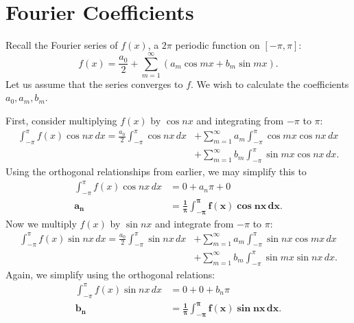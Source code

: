 \documentclass{amsart}
\begin{document}
  \section{Fourier Coefficients}

  Recall the Fourier series of $f(x)$, a $2\pi$ periodic function on $[-\pi, \pi]$:
  \begin{equation}
    f(x) = \frac{a_0}{2} + \sum_{m=1}^{\infty} (a_m \cos mx + b_m \sin mx).
  \end{equation}
  Let us assume that the series converges to $f$. We wish to calculate the coefficients $a_0, a_m, b_m$. 

  First, consider multiplying $f(x)$ by $\cos nx$ and integrating from $-\pi$ to $\pi$:
  \begin{align*}
    \int_{-\pi}^{\pi} f(x) \cos nx \, dx = \frac{a_0}{2} \int_{-\pi}^{\pi} \cos nx \, dx &+ \sum_{m=1}^{\infty} a_m \int_{-\pi}^{\pi}\cos mx \cos nx \, dx \\ &+ \sum_{m=1}^{\infty} b_m \int_{-\pi}^{\pi} \sin mx \cos nx \, dx .
  \end{align*}
  Using the orthogonal relationships from earlier, we may simplify this to 
  \begin{align*}
    \int_{-\pi}^{\pi} f(x) \cos nx \, dx &= 0 + a_n \pi + 0\\
    \bm{a_n} &\bm{= \frac{1}{\pi} \int_{-\pi}^{\pi} f(x) \cos nx \, dx} .
  \end{align*}
  Now we multiply $f(x)$ by $\sin nx$ and integrate from $-\pi$ to $\pi$:
  \begin{align*}
    \int_{-\pi}^{\pi} f(x) \sin nx \, dx = \frac{a_0}{2} \int_{-\pi}^{\pi} \sin nx \, dx &+ \sum_{m=1}^{\infty} a_m \int_{-\pi}^{\pi}\sin nx \cos mx \, dx \\ &+ \sum_{m=1}^{\infty} b_m \int_{-\pi}^{\pi} \sin mx \sin nx \, dx .
  \end{align*}
  Again, we simplify using the orthogonal relations:
  \begin{align*}
    \int_{-\pi}^{\pi} f(x) \sin nx\, dx &= 0 + 0 + b_n \pi \\
    \bm{b_n} &= \bm{\frac{1}{\pi} \int_{-\pi}^{\pi} f(x) \sin nx\, dx}. 
  \end{align*}
\end{document}
